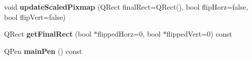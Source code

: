 \begin{DoxyCompactItemize}
\item 
void {\bfseries update\+Scaled\+Pixmap} (Q\+Rect final\+Rect=Q\+Rect(), bool flip\+Horz=false, bool flip\+Vert=false)\hypertarget{class_q_c_p_item_pixmap_a8bced3027b326b290726cd1979c7cfc6}{}\label{class_q_c_p_item_pixmap_a8bced3027b326b290726cd1979c7cfc6}

\item 
Q\+Rect {\bfseries get\+Final\+Rect} (bool $\ast$flipped\+Horz=0, bool $\ast$flipped\+Vert=0) const \hypertarget{class_q_c_p_item_pixmap_a245ef0c626cab7096a810442f2f6a2d9}{}\label{class_q_c_p_item_pixmap_a245ef0c626cab7096a810442f2f6a2d9}

\item 
Q\+Pen {\bfseries main\+Pen} () const \hypertarget{class_q_c_p_item_pixmap_af21085516585c475dc9d839e7f377233}{}\label{class_q_c_p_item_pixmap_af21085516585c475dc9d839e7f377233}

\end{DoxyCompactItemize}
